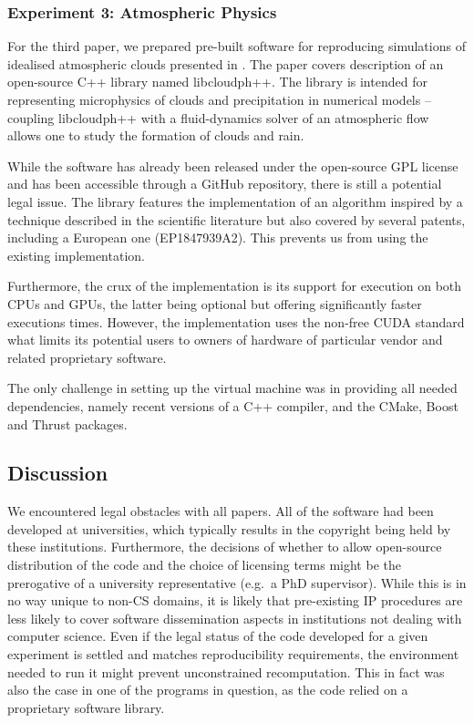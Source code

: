 \subsubsection*{Experiment 3: Atmospheric Physics}

For the third paper, we prepared pre-built software for reproducing 
  simulations of idealised atmospheric clouds presented in \cite{arabas2013libcloud}.
The paper covers description of an open-source C++ library named libcloudph++. 
The library is intended for representing microphysics of clouds and precipitation
  in numerical models -- coupling libcloudph++ with a fluid-dynamics solver 
  of an atmospheric flow allows one to study the formation of clouds and rain.

While the software has already been released under the open-source GPL license
  and has been accessible through a GitHub repository, there is still
  a potential legal issue.
The library features the implementation of an algorithm inspired by a technique 
  described in the scientific literature but also covered by several patents,
  including a European one (EP1847939A2). This prevents us from using the
  existing implementation.

Furthermore, the crux of the implementation is its support for execution
  on both CPUs and GPUs, the latter being optional but offering 
  significantly faster executions times.
However, the implementation uses the non-free CUDA standard what limits its potential
  users to owners of hardware of particular vendor and related proprietary software.

The only challenge in setting up the virtual machine was in providing all needed
  dependencies, namely recent versions of a C++ compiler, and the CMake, Boost and Thrust 
  packages.

\subsection{Discussion}

We encountered legal obstacles with all papers.
All of the software had been developed at universities, which typically results in the copyright being held by these institutions.
Furthermore, the decisions of whether to allow open-source distribution of the
code and the choice of licensing terms might be the prerogative of a university
representative (e.g.\ a PhD supervisor).
While this is in no way unique to non-CS domains, it is likely that pre-existing IP procedures are less likely to cover software dissemination aspects in institutions not dealing with computer science.
Even if the legal status of the code developed for a given experiment is settled and matches reproducibility requirements, the environment needed to run it might prevent unconstrained recomputation.
This in fact was also the case in one of the programs in question, as the code relied on a proprietary software library.

